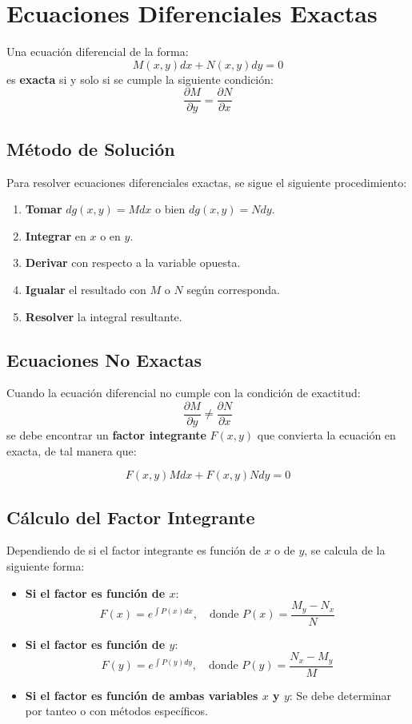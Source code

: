 \section*{Ecuaciones Diferenciales Exactas}

Una ecuación diferencial de la forma:
\[
M(x,y)dx + N(x,y)dy = 0
\]
es \textbf{exacta} si y solo si se cumple la siguiente condición:
\[
\frac{\partial M}{\partial y} = \frac{\partial N}{\partial x}
\]

\subsection*{Método de Solución}

Para resolver ecuaciones diferenciales exactas, se sigue el siguiente procedimiento:

\begin{enumerate}
    \item \textbf{Tomar} \( dg(x,y) = Mdx \) o bien \( dg(x,y) = Ndy \).
    \item \textbf{Integrar} en \( x \) o en \( y \).
    \item \textbf{Derivar} con respecto a la variable opuesta.
    \item \textbf{Igualar} el resultado con \( M \) o \( N \) según corresponda.
    \item \textbf{Resolver} la integral resultante.
\end{enumerate}

\subsection*{Ecuaciones No Exactas}

Cuando la ecuación diferencial no cumple con la condición de exactitud:
\[
\frac{\partial M}{\partial y} \neq \frac{\partial N}{\partial x}
\]
se debe encontrar un \textbf{factor integrante} \( F(x,y) \) que convierta la ecuación en exacta, de tal manera que:

\[
F(x,y) Mdx + F(x,y) Ndy = 0
\]

\subsection*{Cálculo del Factor Integrante}

Dependiendo de si el factor integrante es función de \( x \) o de \( y \), se calcula de la siguiente forma:

\begin{itemize}
    \item \textbf{Si el factor es función de \( x \)}:
    \[
    F(x) = e^{\int P(x) dx}, \quad \text{donde } P(x) = \frac{M_y - N_x}{N}
    \]
    
    \item \textbf{Si el factor es función de \( y \)}:
    \[
    F(y) = e^{\int P(y) dy}, \quad \text{donde } P(y) = \frac{N_x - M_y}{M}
    \]

    \item \textbf{Si el factor es función de ambas variables \( x \) y \( y \)}:  
    Se debe determinar por tanteo o con métodos específicos.
\end{itemize}

